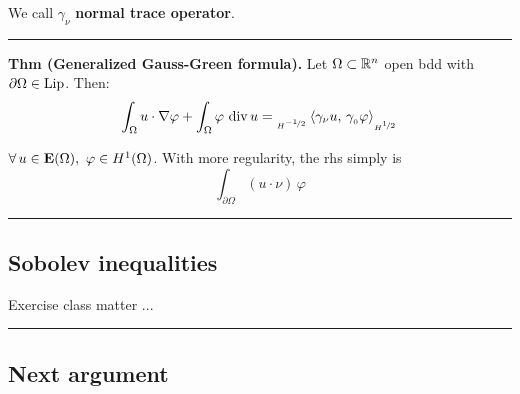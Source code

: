 We call $\gamma_\nu$ \textbf{normal trace operator}.

\rule{0.31\textwidth}{0.2pt}
\smallskip

\textbf{Thm (Generalized Gauss-Green formula).} Let $\Omega\subset\mathbb{R}^n$ open bdd with $\partial\Omega\in\operatorname{Lip}$. Then:
\begin{equation*}
\int_\Omega u\cdot\nabla\varphi+\int_\Omega\varphi\,\operatorname{div} u={}_{_{H^{\nicefrac{-1}{2}}}}\left\langle \gamma_\nu u,\,\gamma_{_0}\varphi \right\rangle_{_{H^{\nicefrac{1}{2}}}}
\end{equation*}

$\forall\, u\in\mathbf{E}(\Omega),\ \varphi\in H^1(\Omega)$. With more regularity, the rhs simply is
\begin{equation*}
\int_{\partial\Omega} (u\cdot\nu)\,\varphi
\end{equation*}

\rule{0.31\textwidth}{0.2pt}


\subsection{\color{red}Sobolev inequalities}


Exercise class matter ...

\rule{0.31\textwidth}{0.2pt}


\subsection{\color{red}Next argument}











